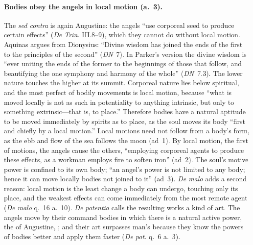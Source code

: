 \paragraph{Bodies obey the angels in local motion (a.~3).} The \emph{sed
contra} is again Augustine: the angels ``use corporeal seed to produce
certain effects'' (\emph{De Trin.} III.8--9), which they cannot do without
local motion. Aquinas argues from Dionysius: ``Divine wisdom has joined the
ends of the first to the principles of the second'' (\emph{DN}~7). In
Parker's version the divine wisdom is ``ever uniting the ends of the former
to the beginnings of those that follow, and beautifying the one symphony
and harmony of the whole'' (\emph{DN}~7.3). The lower nature touches the
higher at its summit. Corporeal nature lies below spiritual, and the most
perfect of bodily movements is local motion, because ``what is moved
locally is not as such in potentiality to anything intrinsic, but only to
something extrinsic---that is, to place.'' Therefore bodies have a natural
aptitude to be moved immediately by spirits as to place, as the soul moves
its body ``first and chiefly by a local motion.'' Local motions need not
follow from a body's form, as the ebb and flow of the sea follows the moon
(ad~1). By local motion, the first of motions, the angels cause the
others, ``employing corporeal agents to produce these effects, as a workman
employs fire to soften iron'' (ad~2). The soul's motive power is confined to
its own body; ``an angel's power is not limited to any body; hence it can
move locally bodies not joined to it'' (ad~3). \emph{De malo} adds a second
reason: local motion is the least change a body can undergo, touching only
its place, and the weakest effects can come immediately from the most
remote agent (\emph{De malo} q.~16 a.~10). \emph{De potentia} calls the
resulting works a kind of art. The angels move by their command bodies in
which there is a natural active power, the  of
Augustine, ; and their art surpasses man's because they know the
powers of bodies better and apply them faster (\emph{De pot.} q.~6 a.~3).

